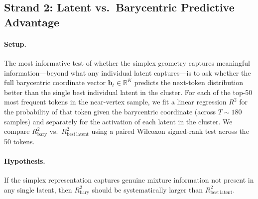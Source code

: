 \documentclass{article}
\newcommand{\bary}{\mathbf{b}}
\newcommand{\R}{\mathbb{R}}
\begin{document}
\subsection{Strand 2: Latent vs.\ Barycentric Predictive Advantage}
\label{sec:bary}

\paragraph{Setup.}  The most informative test of whether the simplex geometry
captures meaningful information---beyond what any individual latent captures---is to
ask whether the full barycentric coordinate vector $\bary_t \in \R^{K}$ predicts
the next-token distribution better than the single best individual latent in the
cluster.  For each of the top-50 most frequent tokens in the near-vertex sample,
we fit a linear regression $R^2$ for the probability of that token given the
barycentric coordinate (across $T \sim 180$ samples) and separately for the
activation of each latent in the cluster.  We compare $R^2_{\mathrm{bary}}$ vs.\
$R^2_{\mathrm{best\,latent}}$ using a paired Wilcoxon signed-rank test across the 50
tokens.

\paragraph{Hypothesis.} If the simplex representation captures genuine mixture
information not present in any single latent, then $R^2_{\mathrm{bary}}$ should be
systematically larger than $R^2_{\mathrm{best\,latent}}$.
\end{document}

